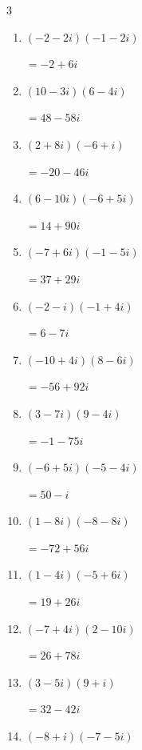 \begin{multicols}{3}
\begin{enumerate}
  \item $\displaystyle (-2-2i)(-1-2i)$

        $\displaystyle =-2+6i$

  \item $\displaystyle (10-3i)(6-4i)$

        $\displaystyle =48-58i$

  \item $\displaystyle (2+8i)(-6+i)$

        $\displaystyle =-20-46i$

  \item $\displaystyle (6-10i)(-6+5i)$

        $\displaystyle =14+90i$

  \item $\displaystyle (-7+6i)(-1-5i)$

        $\displaystyle =37+29i$

  \item $\displaystyle (-2-i)(-1+4i)$

        $\displaystyle =6-7i$

  \item $\displaystyle (-10+4i)(8-6i)$

        $\displaystyle =-56+92i$

  \item $\displaystyle (3-7i)(9-4i)$

        $\displaystyle =-1-75i$

  \item $\displaystyle (-6+5i)(-5-4i)$

        $\displaystyle =50-i$

  \item $\displaystyle (1-8i)(-8-8i)$

        $\displaystyle =-72+56i$

  \item $\displaystyle (1-4i)(-5+6i)$

        $\displaystyle =19+26i$

  \item $\displaystyle (-7+4i)(2-10i)$

        $\displaystyle =26+78i$

  \item $\displaystyle (3-5i)(9+i)$

        $\displaystyle =32-42i$

  \item $\displaystyle (-8+i)(-7-5i)$


\end{enumerate}
\end{multicols}
